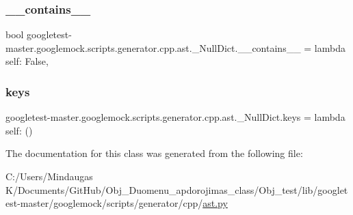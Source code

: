 \subsubsection{\texorpdfstring{\_\_contains\_\_}{\_\_contains\_\_}}
{\footnotesize\ttfamily bool googletest-\/master.\+googlemock.\+scripts.\+generator.\+cpp.\+ast.\+\_\+\+Null\+Dict.\+\_\+\+\_\+contains\+\_\+\+\_\+ = lambda self\+: False\hspace{0.3cm}{\ttfamily [static]}, {\ttfamily [private]}}

\mbox{\label{classgoogletest-master_1_1googlemock_1_1scripts_1_1generator_1_1cpp_1_1ast_1_1___null_dict_ab703b9ea31408cdaf0b66df173d16f1e}} 
\subsubsection{\texorpdfstring{keys}{keys}}
{\footnotesize\ttfamily googletest-\/master.\+googlemock.\+scripts.\+generator.\+cpp.\+ast.\+\_\+\+Null\+Dict.\+keys = lambda self\+: ()\hspace{0.3cm}{\ttfamily [static]}}



The documentation for this class was generated from the following file\+:\begin{DoxyCompactItemize}
\item 
C\+:/\+Users/\+Mindaugas K/\+Documents/\+Git\+Hub/\+Obj\+\_\+\+Duomenu\+\_\+apdorojimas\+\_\+class/\+Obj\+\_\+test/lib/googletest-\/master/googlemock/scripts/generator/cpp/\mbox{\hyperlink{_obj__test_2lib_2googletest-master_2googlemock_2scripts_2generator_2cpp_2ast_8py}{ast.\+py}}\end{DoxyCompactItemize}
